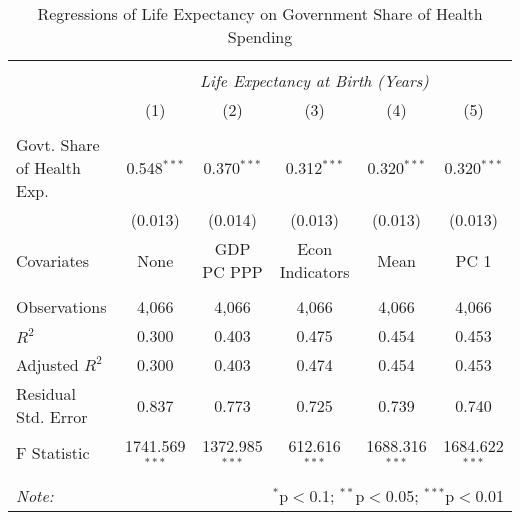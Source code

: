 \begin{table}[!htbp] \centering
  \caption{Regressions of Life Expectancy on Government Share of Health Spending \label{main_regs}}
\begin{tabular}{@{\extracolsep{5pt}}lccccc}
\\[-1.8ex]\hline
\hline \\[-1.8ex]
& \multicolumn{5}{c}{\textit{Life Expectancy at Birth (Years)}} \
\cr \
\\[-1.8ex] & (1) & (2) & (3) & (4) & (5) \\
\hline \\[-1.8ex]
 Govt. Share of Health Exp. & 0.548$^{***}$ & 0.370$^{***}$ & 0.312$^{***}$ & 0.320$^{***}$ & 0.320$^{***}$ \\
  & (0.013) & (0.014) & (0.013) & (0.013) & (0.013) \\
 Covariates & None & GDP PC PPP & Econ Indicators & Mean & PC 1 \\
\hline \\[-1.8ex]
 Observations & 4,066 & 4,066 & 4,066 & 4,066 & 4,066 \\
 $R^2$ & 0.300 & 0.403 & 0.475 & 0.454 & 0.453 \\
 Adjusted $R^2$ & 0.300 & 0.403 & 0.474 & 0.454 & 0.453 \\
 Residual Std. Error & 0.837 & 0.773 & 0.725 & 0.739 & 0.740  \\
 F Statistic & 1741.569$^{***}$  & 1372.985$^{***}$  & 612.616$^{***}$  & 1688.316$^{***}$  & 1684.622$^{***}$  \\
\hline
\hline \\[-1.8ex]
\textit{Note:} & \multicolumn{5}{r}{$^{*}$p$<$0.1; $^{**}$p$<$0.05; $^{***}$p$<$0.01} \\
\end{tabular}
\end{table}
